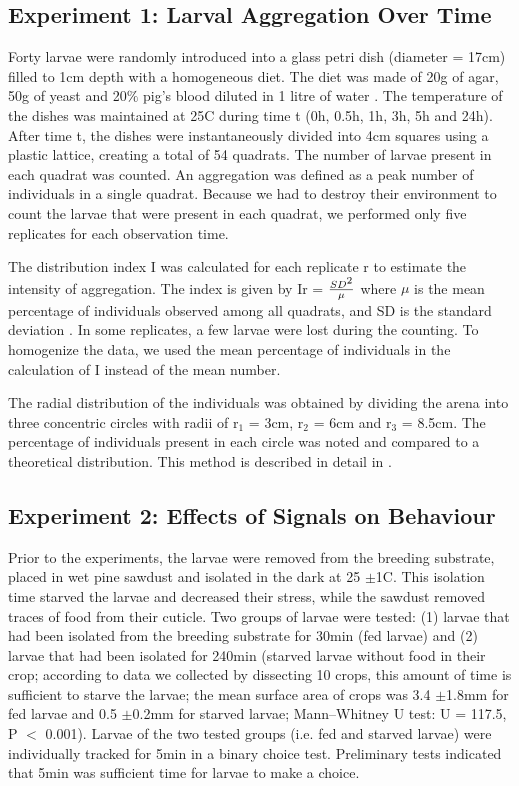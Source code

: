 \subsection{Experiment 1: Larval Aggregation Over Time}
Forty larvae were randomly introduced into a glass petri dish (diameter = 17cm) filled to 1cm depth with a homogeneous diet. The diet was made of 20g of agar, 50g of yeast and 20$\%$ pig's blood diluted in 1 litre of water \citep{daniels_simple_1991}. The temperature of the dishes was maintained at 25C during time t (0h, 0.5h, 1h, 3h, 5h and 24h). After time t, the dishes were instantaneously divided into 4cm squares using a plastic lattice, creating a total of 54 quadrats. The number of larvae present in each quadrat was counted. An aggregation was defined as a peak number of individuals in a single quadrat. Because we had to destroy their environment to count the larvae that were present in each quadrat, we performed only five replicates for each observation time.

The distribution index I was calculated for each replicate r to estimate the intensity of aggregation. The index is given by Ir = $\frac{SD\textsuperscript{2}}{\mu}$ where $\mu$ is the mean percentage of individuals observed among all quadrats, and SD is the standard deviation \cite{canard_quelques_2004}. In some replicates, a few larvae were lost during the counting. To homogenize the data, we used the mean percentage of individuals in the calculation of I instead of the mean number.

The radial distribution of the individuals was obtained by dividing the arena into three concentric circles with radii of r$_{1}$ = 3cm, r$_{2}$ = 6cm and r$_{3}$ = 8.5cm. The percentage of individuals present in each circle was noted and compared to a theoretical distribution. This method is described in detail in \citet{sempo_integration_2006}.


\subsection{Experiment 2: Effects of Signals on Behaviour}
Prior to the experiments, the larvae were removed from the breeding substrate, placed in wet pine sawdust and isolated in the dark at 25 $\pm$1C. This isolation time starved the larvae and decreased their stress, while the sawdust removed traces of food from their cuticle. Two groups of larvae were tested: (1) larvae that had been isolated from the breeding substrate for 30min (fed larvae) and (2) larvae that had been isolated for 240min (starved larvae without food in their crop; according to data we collected by dissecting 10 crops, this amount of time is sufficient to starve the larvae; the mean surface area of crops was 3.4 $\pm$1.8mm for fed larvae and 0.5 $\pm$0.2mm for starved larvae; Mann–Whitney U test: U = 117.5, P $<$ 0.001). Larvae of the two tested groups (i.e. fed and starved larvae) were individually tracked for 5min in a binary choice test. Preliminary tests indicated that 5min was sufficient time for larvae to make a choice.

